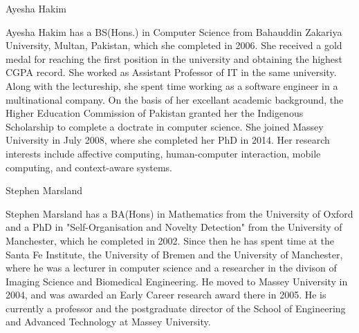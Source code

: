 \documentclass[10pt,journal,cspaper,compsoc]{IEEEtran}
\begin{document}
\ifCLASSOPTIONcaptionsoff
  \newpage
\fi




 

\begin{biography}{Ayesha Hakim}

Ayesha Hakim has a BS(Hons.) in Computer Science from Bahauddin Zakariya University, Multan, Pakistan, which she completed in 2006. She received a gold medal for reaching the first position in the university and obtaining the highest CGPA record. She worked as Assistant Professor of IT in the same university. Along with the lectureship, she spent time working as a software engineer in a multinational company. On the basis of her excellant academic background, the Higher Education Commission of Pakistan granted her the Indigenous Scholarship to complete a doctrate in computer science. She joined Massey University in July 2008, where she completed her PhD in 2014. Her research interests include affective computing, human-computer interaction, mobile computing, and context-aware systems.
\end{biography}

\begin{biography}{Stephen Marsland}

Stephen Marsland has a BA(Hons) in Mathematics from the University of Oxford and a PhD in "Self-Organisation and Novelty Detection" from the University of Manchester, which he completed in 2002. Since then he has spent time at the Santa Fe Institute, the University of Bremen and the University of Manchester, where he was a lecturer in computer science and a researcher in the divison of Imaging Science and Biomedical Engineering. He moved to Massey University in 2004, and was awarded an Early Career research award there in 2005. He is currently a professor and the postgraduate director of the School of Engineering and Advanced Technology at Massey University.
\end{biography}
\end{document}
